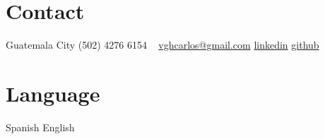 \documentclass[]{friggeri-cv} %
\begin{document}


\begin{aside} %
\section{Contact}
Guatemala City
(502) 4276 6154
~
\href{mailto:vghcarlos@gmail.com}{vghcarlos@gmail.com}
\href{https://www.linkedin.com/pub/carlos-hern\%C3\%A1ndez/87/1b1/157}{linkedin}
\href{https://github.com/learnercys}{github}
\section{Language}
Spanish
English
\end{aside}


\end{document}
